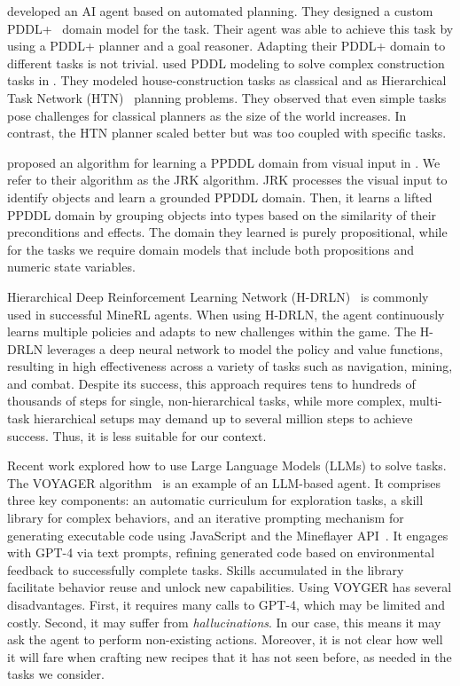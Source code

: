 \citet{roberts2017automated} developed an AI \mcraft agent based on automated planning. They designed a custom PDDL+~\cite{fox2002pddl+} domain model for the \mcraft task. Their agent was able to achieve this task by using a PDDL+ planner and a goal reasoner. Adapting their PDDL+ domain to different tasks is not trivial. 
\citet{wichlacz2019construction} used PDDL modeling to solve complex construction tasks in \mcraft. 
They modeled house-construction tasks as classical and as Hierarchical Task Network (HTN)~\citep{georgievski2015htn} planning problems. 
They observed that even simple tasks pose challenges for classical planners as the size of the world increases. 
In contrast, the HTN planner scaled better but was too coupled with specific tasks.


\citet{james2022autonomous} proposed an algorithm for learning a PPDDL domain from visual input in \mcraft. We refer to their algorithm as the JRK algorithm. 
JRK processes the visual input to identify objects and learn a grounded PPDDL domain. 
Then, it learns a lifted PPDDL domain by grouping objects into types based on the similarity of their preconditions and effects. 
The domain they learned is purely propositional, while for the \mcraft tasks we require domain models that include both propositions and numeric state variables. 



Hierarchical Deep Reinforcement Learning Network (H-DRLN)~\citep{tessler2017deep}  
is commonly used in successful MineRL agents. 
When using H-DRLN, the agent continuously learns multiple policies and adapts to new challenges within the game. 
The H-DRLN leverages a deep neural network to model the policy and value functions, resulting in high effectiveness across a variety of \mcraft tasks such as navigation, mining, and combat. Despite its success, this approach requires tens to hundreds of thousands of steps for single, non-hierarchical tasks, while more complex, multi-task hierarchical setups may demand up to several million steps to achieve success. 
Thus, it is less suitable for our context. 


Recent work explored how to use Large Language Models (LLMs) to solve \mcraft tasks. 
The VOYAGER algorithm~\citep{wang2024voyager} is an example of an LLM-based \mcraft agent. It comprises three key components: an automatic curriculum for exploration tasks, a skill library for complex behaviors, and an iterative prompting mechanism for generating executable code using JavaScript and the Mineflayer API~\citep{PrismarineJS2013}. It engages with GPT-4 via text prompts, refining generated code based on environmental feedback to successfully complete tasks. Skills accumulated in the library facilitate behavior reuse and unlock new capabilities. 
Using VOYGER has several disadvantages. 
First, it requires many calls to GPT-4, which may be limited and costly. 
Second, it may suffer from \emph{hallucinations}. 
In our case, this means it may ask the agent to perform non-existing actions. Moreover, it is not clear how well it will fare when crafting new recipes that it has not seen before, as needed in the tasks we consider. 

